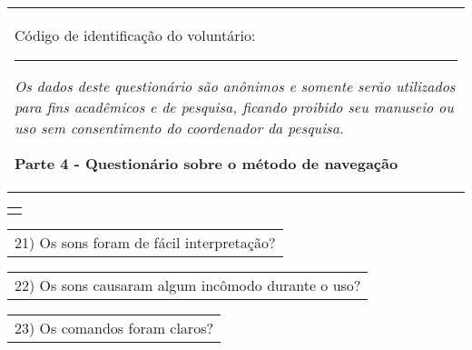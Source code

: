 \begin{table}[!thb]
    \begin{tabular}{m{1\linewidth}}

        {\color{gray}
        
        Código de identificação do voluntário: \rule{1in}{.2mm}
        
        \textit{Os dados deste questionário são anônimos e somente serão utilizados para fins acadêmicos e de pesquisa, ficando proibido seu manuseio ou uso sem consentimento do coordenador da pesquisa.}
        }
        
        \begin{center}
        \textbf{Parte 4 - Questionário sobre o método de navegação}
        \end{center}
        
    \end{tabular}
%
    \begin{tabular}{>{\centering\arraybackslash}m{1\linewidth}}
        {\large TESTE 4 - MISTURADO (ÁUDIO E CINTO)}
    \end{tabular}


    \begin{tabular}{m{1\linewidth}}
        \vspace{1ex}
        21)	Os sons foram de fácil interpretação?
    \end{tabular}

    
    

    \begin{tabular}{m{1\linewidth}}
        \vspace{1ex}
        22)	Os sons causaram algum incômodo durante o uso?
    \end{tabular}

    
    

    \begin{tabular}{m{1\linewidth}}
        \vspace{1ex}
        23)	Os comandos foram claros?
    \end{tabular}

    
    


\end{table}

